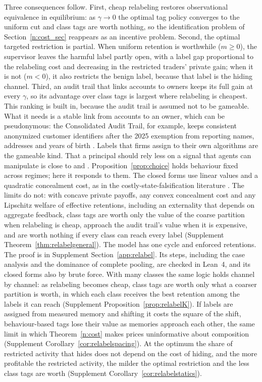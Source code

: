 \documentclass[12pt]{article}
\theoremstyle{definition}
\theoremstyle{remark}
\begin{document}
Three consequences follow. First, cheap relabeling restores observational equivalence in equilibrium: as $\gamma\to0$ the optimal tag policy converges to the uniform cut and class tags are worth nothing, so the identification problem of Section~\ref{n:cost_sec} reappears as an incentive problem. Second, the optimal targeted restriction is partial. When uniform retention is worthwhile ($m\ge0$), the supervisor leaves the harmful label partly open, with a label gap proportional to the relabeling cost and decreasing in the restricted traders' private gain; when it is not ($m<0$), it also restricts the benign label, because that label is the hiding channel. Third, an audit trail that links accounts to owners keeps its full gain at every $\gamma$, so its advantage over class tags is largest where relabeling is cheapest. This ranking is built in, because the audit trail is assumed not to be gameable. What it needs is a stable link from accounts to an owner, which can be pseudonymous: the Consolidated Audit Trail, for example, keeps consistent anonymized customer identifiers after the 2025 exemption from reporting names, addresses and years of birth \citep{sec2025cat}. Labels that firms assign to their own algorithms are the gameable kind. That a principal should rely less on a signal that agents can manipulate is close to \citet{frankel2022} and \citet{perezrichet2022}. Proposition~\ref{prop:choice} holds behaviour fixed across regimes; here it responds to them. The closed forms use linear values and a quadratic concealment cost, as in the costly-state-falsification literature \citep{lackerweinberg1989,crockermorgan1998}. The limits do not: with concave private payoffs, any convex concealment cost and any Lipschitz welfare of effective retentions, including an externality that depends on aggregate feedback, class tags are worth only the value of the coarse partition when relabeling is cheap, approach the audit trail's value when it is expensive, and are worth nothing if every class can reach every label (Supplement Theorem~\ref{thm:relabelgeneral}). The model has one cycle and enforced retentions. The proof is in Supplement Section~\ref{app:relabel}. Its steps, including the case analysis and the dominance of complete pooling, are checked in Lean~4, and its closed forms also by brute force. With many classes the same logic holds channel by channel: as relabeling becomes cheap, class tags are worth only what a coarser partition is worth, in which each class receives the best retention among the labels it can reach (Supplement Proposition~\ref{prop:relabelK}). If labels are assigned from measured memory and shifting it costs the square of the shift, behaviour-based tags lose their value as memories approach each other, the same limit in which Theorem~\ref{n:cost} makes prices uninformative about composition (Supplement Corollary~\ref{cor:relabelspacing}). At the optimum the share of restricted activity that hides does not depend on the cost of hiding, and the more profitable the restricted activity, the milder the optimal restriction and the less class tags are worth (Supplement Corollary~\ref{cor:relabelstatics}).
\end{document}
